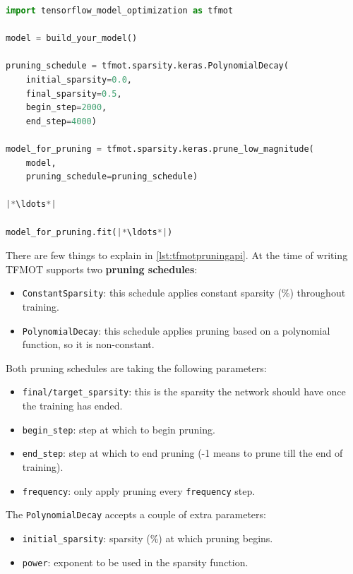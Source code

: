 \begin{lstlisting}[language=Python, label={lst:tfmotpruningapi},
    caption=Pruning API in TFMOT]
import tensorflow_model_optimization as tfmot

model = build_your_model()

pruning_schedule = tfmot.sparsity.keras.PolynomialDecay(
    initial_sparsity=0.0,
    final_sparsity=0.5,
    begin_step=2000,
    end_step=4000)

model_for_pruning = tfmot.sparsity.keras.prune_low_magnitude(
    model,
    pruning_schedule=pruning_schedule)

|*\ldots*|

model_for_pruning.fit(|*\ldots*|)
\end{lstlisting}

There are few things to explain in \autoref{lst:tfmotpruningapi}. At the time
of writing TFMOT supports two \textbf{pruning schedules}:

\begin{itemize}
    \item \texttt{ConstantSparsity}: this schedule applies constant sparsity
        (\%) throughout training.
    \item \texttt{PolynomialDecay}: this schedule applies pruning based on a
        polynomial function, so it is non-constant.
\end{itemize}

Both pruning schedules are taking the following parameters:

\begin{itemize}
    \item \texttt{final/target\_sparsity}: this is the sparsity the network
        should have once the training has ended.
    \item \texttt{begin\_step}: step at which to begin pruning.
    \item \texttt{end\_step}: step at which to end pruning (-1 means to prune
        till the end of training).
    \item \texttt{frequency}: only apply pruning every \texttt{frequency} step.
\end{itemize}

The \texttt{PolynomialDecay} accepts a couple of extra parameters:

\begin{itemize}
    \item \texttt{initial\_sparsity}: sparsity (\%) at which pruning begins.
    \item \texttt{power}: exponent to be used in the sparsity function.
\end{itemize}

